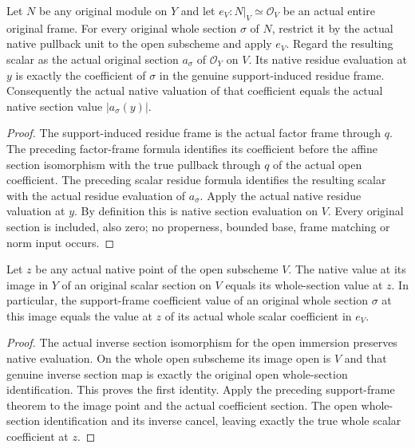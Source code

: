 \begin{theorem}\label{thm:fc-native-support-frame-section-evaluation}
\leanok
{}
Let $N$ be any original module on $Y$ and let
$e_V:N|_V\simeq\mathcal O_V$ be an actual entire original frame.
For every original whole section $\sigma$ of $N$, restrict it by
the actual native pullback unit to the open subscheme and apply
$e_V$. Regard the resulting scalar as the actual original section
$a_\sigma$ of $\mathcal O_Y$ on $V$. Its native residue evaluation
at $y$ is exactly the coefficient of $\sigma$ in the genuine
support-induced residue frame. Consequently the actual native
valuation of that coefficient equals the actual native section
value $|a_\sigma(y)|$.
\end{theorem}
\begin{proof}
The support-induced residue frame is the actual factor frame
through $q$. The preceding factor-frame formula identifies its
coefficient before the affine section isomorphism with the true
pullback through $q$ of the actual open coefficient. The preceding
scalar residue formula identifies the resulting scalar with the
actual residue evaluation of $a_\sigma$. Apply the actual native
residue valuation at $y$. By definition this is native section
evaluation on $V$. Every original section is included, also zero;
no properness, bounded base, frame matching or norm input occurs.
\end{proof}

\begin{lemma}\label{lem:fc-native-open-frame-lift-evaluation}
\leanok
{}
Let $z$ be any actual native point of the open subscheme $V$.
The native value at its image in $Y$ of an original scalar section
on $V$ equals its whole-section value at $z$. In particular, the
support-frame coefficient value of an original whole section
$\sigma$ at this image equals the value at $z$ of its actual
whole scalar coefficient in $e_V$.
\end{lemma}
\begin{proof}
The actual inverse section isomorphism for the open immersion
preserves native evaluation. On the whole open subscheme its
image open is $V$ and that genuine inverse section map is exactly
the original open whole-section identification. This proves the
first identity. Apply the preceding support-frame theorem to the
image point and the actual coefficient section. The open
whole-section identification and its inverse cancel, leaving
exactly the true whole scalar coefficient at $z$.
\end{proof}

